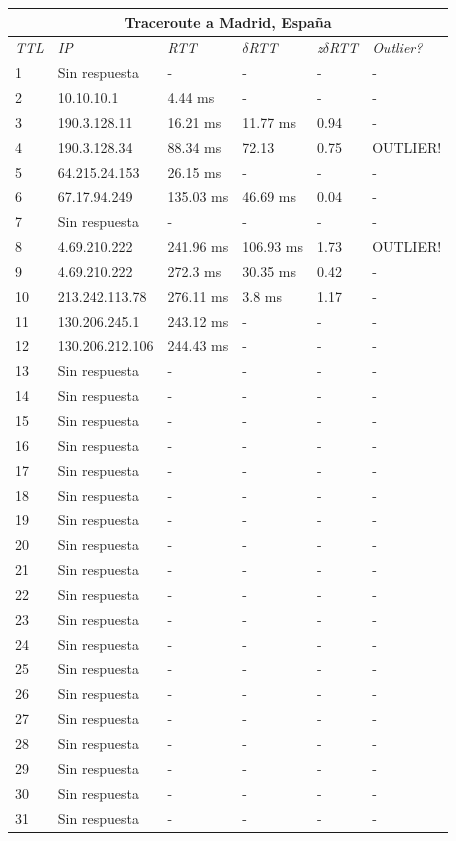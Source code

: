 \begin{tabular}{ |p{2cm}||p{3cm}|p{3cm}|p{3cm}|p{3cm}|p{3cm}|   }
 \hline
 \multicolumn{6}{|c|}{Traceroute a Madrid, España} \\
 \hline
 \textit{TTL} & \textit{IP}  & \textit{RTT} & $\delta$\textit{RTT} & \textit{z}$\delta$\textit{RTT}& \textit{Outlier?}\\
 \hline
 1   & Sin respuesta  & - &   - & - & -\\
 2   & 10.10.10.1 & 4.44 ms &   - & - & -\\
 3   & 190.3.128.11  & 16.21 ms & 11.77 ms & 0.94 & - \\
 4   & 190.3.128.34   & 88.34 ms &  72.13 & 0.75 & OUTLIER!\\	
 5   & 64.215.24.153  & 26.15 ms &  - & - & -\\
 6   &  67.17.94.249 & 135.03 ms &  46.69 ms & 0.04 & -\\
 7   & Sin respuesta  & - &  - & - & -\\
 8   & 4.69.210.222  & 241.96 ms & 106.93 ms &  1.73 & OUTLIER!\\
 9   & 4.69.210.222 & 272.3 ms &  30.35 ms & 0.42 & -\\
 10   & 213.242.113.78   & 276.11 ms & 3.8 ms & 1.17 & -\\
 11   & 130.206.245.1   & 243.12 ms & - & - & -\\
 12   & 130.206.212.106  & 244.43 ms &  - & - & -\\
 13   & Sin respuesta  & - & - & - & -\\
 14   & Sin respuesta  & - & - & - & -\\
 15   & Sin respuesta  & - & - & - & -\\
 16   & Sin respuesta  & - & - & - & -\\
 17   & Sin respuesta  & - & - & - & -\\
 18   & Sin respuesta  & - & - & - & -\\
 19   & Sin respuesta  & - & - & - & -\\
 20   & Sin respuesta  & - & - & - & -\\
 21   & Sin respuesta  & - & - & - & -\\
 22   & Sin respuesta  & - & - & - & -\\
 23   & Sin respuesta  & - & - & - & -\\
 24   & Sin respuesta  & - & - & - & -\\
 25   & Sin respuesta  & - & - & - & -\\
 26   & Sin respuesta  & - & - & - & -\\
 27   & Sin respuesta  & - & - & - & -\\
 28   & Sin respuesta  & - & - & - & -\\
 29   & Sin respuesta  & - & - & - & -\\
 30   & Sin respuesta  & - & - & - & -\\
 31   & Sin respuesta  & - & - & - & -\\
 \hline
\end{tabular} \\ \\


